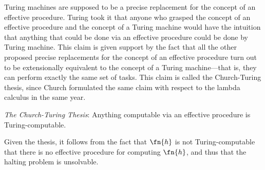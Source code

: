 \documentclass[../../include/open-logic-section]{subfiles}
\begin{document}

Turing machines are supposed to be a precise replacement for the concept of an effective procedure. Turing took it that anyone who grasped the concept of an effective procedure and the concept of a Turing machine would have the intuition that anything that could be done via an effective procedure could be done by Turing machine. This claim is given support by the fact that all the other proposed precise replacements for the concept of an effective procedure turn out to be extensionally equivalent to the concept of a Turing machine---that is, they can perform exactly the same set of tasks. This claim is called the Church-Turing thesis, since Church formulated the same claim with respect to the lambda calculus in the same year.

\begin{defn}
\emph{The Church-Turing Thesis}: Anything computable via an effective procedure is Turing-computable.
\end{defn}

Given the thesis, it follows from the fact that $\fn{h}$ is not Turing-computable that there is no effective procedure for computing $\fn{h}$, and thus that the halting problem is unsolvable.
\end{document}
